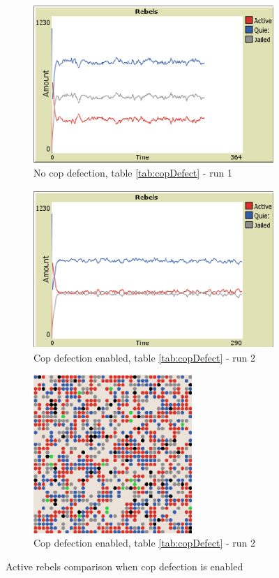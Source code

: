 \documentclass[a4paper,11pt]{article}
\begin{document}
\begin{figure}[h]
 \begin{subfigure}{0.33\textwidth}
  \includegraphics[width=\linewidth, height=6cm]{plot_no_defection_1.png} 
  \caption{No cop defection, table \ref{tab:copDefect} - run 1}
  \label{fig:copDefect1}
 \end{subfigure}
 \begin{subfigure}{0.33\textwidth}
  \includegraphics[width=\linewidth, height=6cm]{plot_cop_defection_1.png}
  \caption{Cop defection enabled, table \ref{tab:copDefect} - run 2}
  \label{fig:copDefect2}
 \end{subfigure}
 \begin{subfigure}{0.33\textwidth}
  \includegraphics[width=\linewidth, height=6cm]{cop_defection.png}
  \caption{Cop defection enabled, table \ref{tab:copDefect} - run 2}
  \label{fig:copDefect3}
 \end{subfigure}
\caption{Active rebels comparison when cop defection is enabled}
\label{fig:figCopDefection}
\end{figure}
\end{document}
